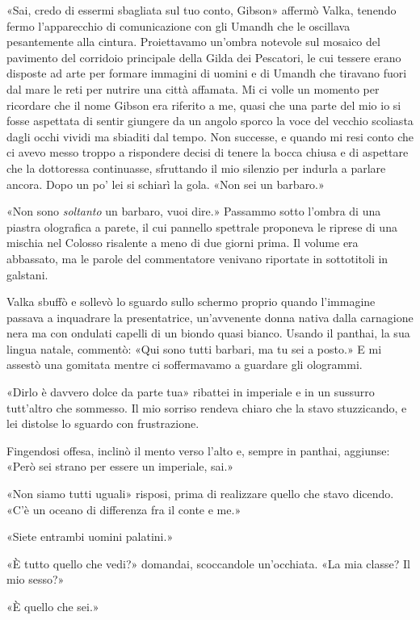 «Sai, credo di essermi sbagliata sul tuo conto, Gibson» affermò Valka,
tenendo fermo l'apparecchio di comunicazione con gli Umandh che le
oscillava pesantemente alla cintura. Proiettavamo un'ombra notevole sul
mosaico del pavimento del corridoio principale della Gilda dei
Pescatori, le cui tessere erano disposte ad arte per formare immagini di
uomini e di Umandh che tiravano fuori dal mare le reti per nutrire una
città affamata. Mi ci volle un momento per ricordare che il nome Gibson
era riferito a me, quasi che una parte del mio io si fosse aspettata di
sentir giungere da un angolo sporco la voce del vecchio scoliasta dagli
occhi vividi ma sbiaditi dal tempo. Non successe, e quando mi resi conto
che ci avevo messo troppo a rispondere decisi di tenere la bocca chiusa
e di aspettare che la dottoressa continuasse, sfruttando il mio silenzio
per indurla a parlare ancora. Dopo un po' lei si schiarì la gola. «Non
sei un barbaro.»

«Non sono \emph{soltanto} un barbaro, vuoi dire.» Passammo sotto l'ombra
di una piastra olografica a parete, il cui pannello spettrale proponeva
le riprese di una mischia nel Colosso risalente a meno di due giorni
prima. Il volume era abbassato, ma le parole del commentatore venivano
riportate in sottotitoli in galstani.

Valka sbuffò e sollevò lo sguardo sullo schermo proprio quando
l'immagine passava a inquadrare la presentatrice, un'avvenente donna
nativa dalla carnagione nera ma con ondulati capelli di un biondo quasi
bianco. Usando il panthai, la sua lingua natale, commentò: «Qui sono
tutti barbari, ma tu sei a posto.» E mi assestò una gomitata mentre ci
soffermavamo a guardare gli ologrammi.

«Dirlo è davvero dolce da parte tua» ribattei in imperiale e in un
sussurro tutt'altro che sommesso. Il mio sorriso rendeva chiaro che la
stavo stuzzicando, e lei distolse lo sguardo con frustrazione.

Fingendosi offesa, inclinò il mento verso l'alto e, sempre in panthai,
aggiunse: «Però sei strano per essere un imperiale, sai.»

«Non siamo tutti uguali» risposi, prima di realizzare quello che stavo
dicendo. «C'è un oceano di differenza fra il conte e me.»

«Siete entrambi uomini palatini.»

«È tutto quello che vedi?» domandai, scoccandole un'occhiata. «La mia
classe? Il mio sesso?»

«È quello che sei.»

